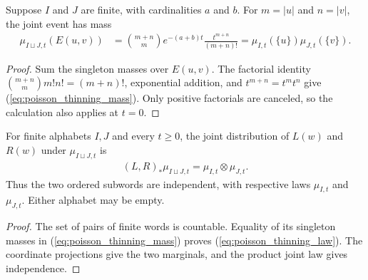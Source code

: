 \begin{lemma}
    \label{lem:poisson_thinning_mass}
    \leanok
    Suppose $I$ and $J$ are finite, with cardinalities $a$ and $b$.
    For $m=|u|$ and $n=|v|$, the joint event has mass
    \begin{align}
        \mu_{I\sqcup J,t}(E(u,v))
        &=\binom{m+n}{m}e^{-(a+b)t}\frac{t^{m+n}}{(m+n)!}
          =\mu_{I,t}(\{u\})\mu_{J,t}(\{v\}).
        \label{eq:poisson_thinning_mass}
    \end{align}
\end{lemma}
\begin{proof}
    \leanok
    Sum the singleton masses over $E(u,v)$. The factorial identity
    $\binom{m+n}{m}m!n!=(m+n)!$, exponential addition, and
    $t^{m+n}=t^mt^n$ give (\ref{eq:poisson_thinning_mass}). Only positive
    factorials are canceled, so the calculation also applies at $t=0$.
\end{proof}

\begin{theorem}
    \label{thm:poisson_word_thinning}
    \leanok
    For finite alphabets $I,J$ and every $t\geq 0$, the joint distribution
    of $L(w)$ and $R(w)$ under $\mu_{I\sqcup J,t}$ is
    \begin{align}
        (L,R)_*\mu_{I\sqcup J,t}=\mu_{I,t}\otimes\mu_{J,t}.
        \label{eq:poisson_thinning_law}
    \end{align}
    Thus the two ordered subwords are independent, with respective laws
    $\mu_{I,t}$ and $\mu_{J,t}$. Either alphabet may be empty.
\end{theorem}
\begin{proof}
    \leanok
    The set of pairs of finite words is countable. Equality of its singleton
    masses in (\ref{eq:poisson_thinning_mass}) proves
    (\ref{eq:poisson_thinning_law}). The coordinate projections give the two
    marginals, and the product joint law gives independence.
\end{proof}
